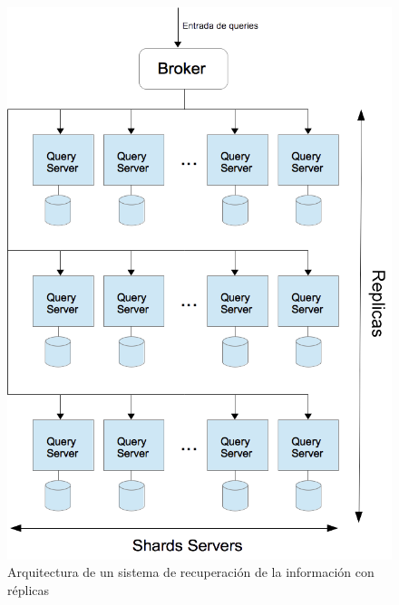 \begin{figure}[tp]
\centering
\includegraphics[scale=.75]{images/sistemaIR.png}
\caption{Arquitectura de un sistema de recuperación de la información con réplicas}
\label{fig:sistemaIR}
\end{figure}

